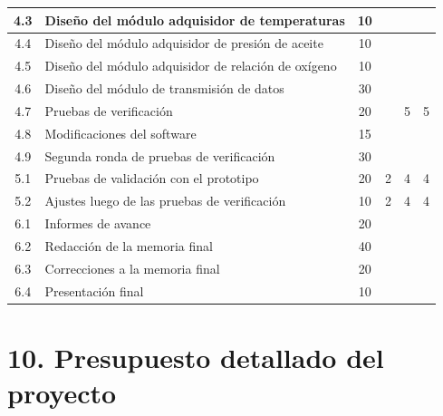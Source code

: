 \documentclass[11pt]{charter}
\begin{document}
\begin{table}
\begin{tabularx}{\linewidth}{@{}|c|X|c|c|c|c|@{}}
 4.3 & Diseño del módulo adquisidor de temperaturas			 & 10 &  &  &  \\ \hline
 4.4 & Diseño del módulo adquisidor de presión de aceite		 & 10 &  &  &  \\ \hline
 4.5 & Diseño del módulo adquisidor de relación de oxígeno	 & 10 &  &  &  \\ \hline
 4.6 & Diseño del módulo de transmisión de datos				 & 30 &  &  &  \\ \hline
 4.7 & Pruebas de verificación									 & 20 &  & 5 & 5 \\ \hline
 4.8 & Modificaciones del software								 & 15 &  &  &  \\ \hline
 4.9 & Segunda ronda de pruebas de verificación				 & 30 &  &  &  \\ \hline
 5.1 & Pruebas de validación con el prototipo 					 & 20 & 2 & 4 & 4 \\ \hline 
 5.2 & Ajustes luego de las pruebas de verificación			 & 10  & 2 & 4 & 4 \\ \hline
 6.1 & Informes de avance											 & 20 &  &  &  \\ \hline
 6.2 & Redacción de la memoria final							 & 40 &  &  &  \\ \hline
 6.3 & Correcciones a la memoria final							 & 20 &  &  &  \\ \hline
 6.4 & Presentación final											 & 10 &  &  &  \\ \hline
\end{tabularx}
\end{table}

\section{10. Presupuesto detallado del proyecto}
\label{sec:presupuesto}
\end{document}
